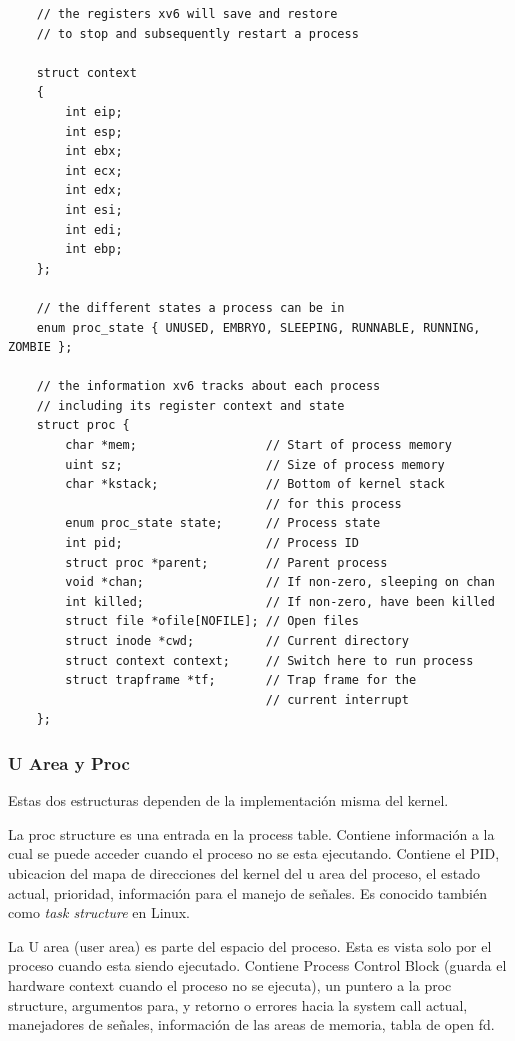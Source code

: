 \documentclass[titlepage,a4paper]{article}
\begin{document}
\begin{verbatim}
    // the registers xv6 will save and restore
    // to stop and subsequently restart a process
    
    struct context
    {
        int eip;
        int esp;
        int ebx;
        int ecx;
        int edx;
        int esi;
        int edi;
        int ebp;
    };
    
    // the different states a process can be in
    enum proc_state { UNUSED, EMBRYO, SLEEPING, RUNNABLE, RUNNING, ZOMBIE };
    
    // the information xv6 tracks about each process
    // including its register context and state
    struct proc {
        char *mem;                  // Start of process memory
        uint sz;                    // Size of process memory
        char *kstack;               // Bottom of kernel stack
                                    // for this process
        enum proc_state state;      // Process state
        int pid;                    // Process ID
        struct proc *parent;        // Parent process
        void *chan;                 // If non-zero, sleeping on chan
        int killed;                 // If non-zero, have been killed
        struct file *ofile[NOFILE]; // Open files
        struct inode *cwd;          // Current directory
        struct context context;     // Switch here to run process
        struct trapframe *tf;       // Trap frame for the
                                    // current interrupt
    };
\end{verbatim}

\subsubsection*{U Area y Proc}
Estas dos estructuras dependen de la implementación misma del kernel.

La proc structure es una entrada en la process table. Contiene información a la cual se puede acceder cuando el proceso no se esta ejecutando. Contiene el PID, ubicacion del mapa de direcciones del kernel del u area del proceso, el estado actual, prioridad, información para el manejo de señales. Es conocido también como \textit{task structure} en Linux.

La U area (user area) es parte del espacio del proceso. Esta es vista solo por el proceso cuando esta siendo ejecutado. Contiene Process Control Block (guarda el hardware context cuando el proceso no se ejecuta), un puntero a la proc structure, argumentos para, y retorno o errores hacia la system call actual, manejadores de señales, información de las areas de memoria, tabla de open fd.
\end{document}
